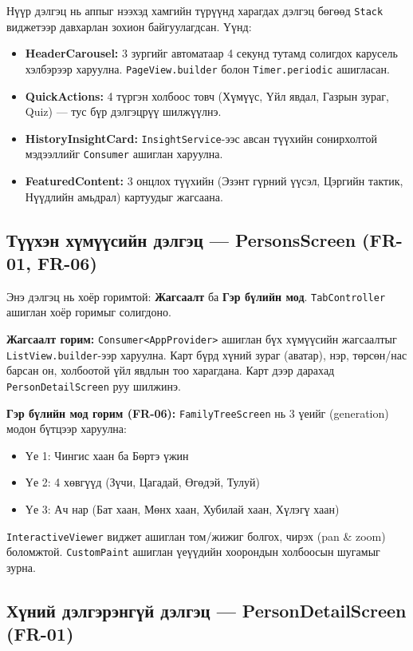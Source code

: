 Нүүр дэлгэц нь аппыг нээхэд хамгийн түрүүнд харагдах дэлгэц бөгөөд \texttt{Stack} виджетээр давхарлан зохион байгуулагдсан. Үүнд:

\begin{itemize}
	\item \textbf{HeaderCarousel:} 3 зургийг автоматаар 4 секунд тутамд солигдох карусель хэлбэрээр харуулна. \texttt{PageView.builder} болон \texttt{Timer.periodic} ашигласан.
	\item \textbf{QuickActions:} 4 түргэн холбоос товч (Хүмүүс, Үйл явдал, Газрын зураг, Quiz) — тус бүр дэлгэцрүү шилжүүлнэ.
	\item \textbf{HistoryInsightCard:} \texttt{InsightService}-ээс авсан түүхийн сонирхолтой мэдээллийг \texttt{Consumer} ашиглан харуулна.
	\item \textbf{FeaturedContent:} 3 онцлох түүхийн (Эзэнт гүрний үүсэл, Цэргийн тактик, Нүүдлийн амьдрал) картуудыг жагсаана.
\end{itemize}

\subsection{Түүхэн хүмүүсийн дэлгэц — PersonsScreen (FR-01, FR-06)}

Энэ дэлгэц нь хоёр горимтой: \textbf{Жагсаалт} ба \textbf{Гэр бүлийн мод}. \texttt{TabController} ашиглан хоёр горимыг солигдоно.

\textbf{Жагсаалт горим:} \texttt{Consumer<AppProvider>} ашиглан бүх хүмүүсийн жагсаалтыг \texttt{ListView.builder}-ээр харуулна. Карт бүрд хүний зураг (аватар), нэр, төрсөн/нас барсан он, холбоотой үйл явдлын тоо харагдана. Карт дээр дарахад \texttt{PersonDetailScreen} руу шилжинэ.

\textbf{Гэр бүлийн мод горим (FR-06):} \texttt{FamilyTreeScreen} нь 3 үеийг (generation) модон бүтцээр харуулна:
\begin{itemize}
	\item Үе 1: Чингис хаан ба Бөртэ үжин
	\item Үе 2: 4 хөвгүүд (Зүчи, Цагадай, Өгөдэй, Тулуй)
	\item Үе 3: Ач нар (Бат хаан, Мөнх хаан, Хубилай хаан, Хүлэгү хаан)
\end{itemize}

\texttt{InteractiveViewer} виджет ашиглан том/жижиг болгох, чирэх (pan \& zoom) боломжтой. \texttt{CustomPaint} ашиглан үеүүдийн хоорондын холбоосын шугамыг зурна.

\subsection{Хүний дэлгэрэнгүй дэлгэц — PersonDetailScreen (FR-01)}


